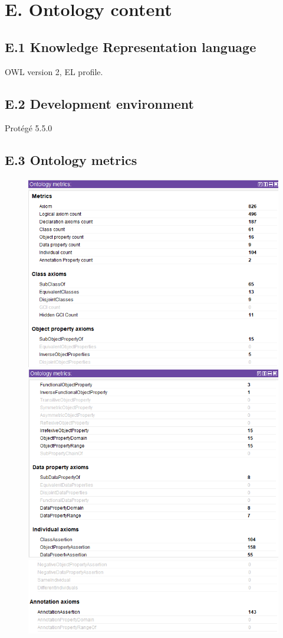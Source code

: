 \documentclass{article}
\begin{document}
\section*{E. Ontology content}

\subsection*{E.1 Knowledge Representation language}
OWL version 2, EL profile.  
\subsection*{E.2 Development environment}
Protégé 5.5.0
\subsection*{E.3 Ontology metrics}
\begin{figure}[h]
 \centering
\includegraphics[scale=0.4]{Metrics1} 
\includegraphics[scale=0.4]{Metrics2}
\includegraphics[scale=0.4]{Metrics3}
\end{figure}
\end{document}
